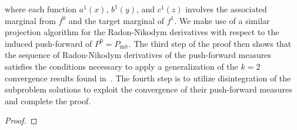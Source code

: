 \documentclass{article}
\newcommand{\B}{\mathcal{B}}
\newcommand{\initmeas}{P_{\text{init}}}
\begin{document}
where each function $a^1(x)$, $b^1(y)$, and $c^1(z)$ involves the associated marginal from $f^0$ and the target marginal of $f^1$. 
We make use of a similar projection algorithm for the Radon-Nikodym derivatives with respect to the induced push-forward of $P^0=\initmeas$.
The third step of the proof then shows that the sequence of Radon-Nikodym derivatives of the push-forward measures satisfies the conditions necessary to apply a generalization of the $k=2$ convergence results found in~\cite{Ruschendorf1995}.
The fourth step is to utilize disintegration of the subproblem solutions to exploit the convergence of their push-forward measures and complete the proof.



\begin{proof}

\end{proof}
\end{document}
